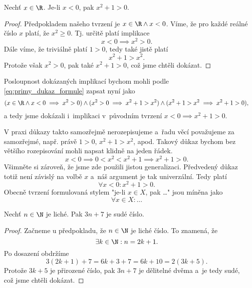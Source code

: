 \begin{proposition}
    Nechť $x\in\R$. Je-li $x<0$, pak $x^2+1>0$.
\end{proposition}
\begin{proof}
    Předpokladem našeho tvrzení je $x\in\R \land x<0$. Víme, že pro každé reálné číslo $x$ platí, že $x^2\geq 0$. Tj. určitě platí implikace
    \begin{equation*}
        x<0 \implies x^2>0.
    \end{equation*}
    Dále víme, že triviálně platí $1>0$, tedy také jistě platí
    \begin{equation*}
        x^2+1>x^2.
    \end{equation*}
    Protože však $x^2>0$, pak také
    $x^2+1>0$, což jsme chtěli dokázat.
\end{proof}
Posloupnost dokázaných implikací bychom mohli podle \eqref{eq:primy_dukaz_formule} zapsat nyní jako
\begin{equation*}
    (x\in\R \land x<0 \implies x^2>0) \land (x^2>0 \implies x^2+1>x^2) \land (x^2+1>x^2 \implies x^2+1>0),
\end{equation*}
a tedy jsme dokázali i~implikaci v~původním tvrzení $x<0 \implies x^2+1>0$.\par
V praxi důkazy takto samozřejmě nerozepisujeme a~řadu věcí považujeme za samozřejmé, např. právě $1>0$, $x^2+1>x^2$, apod. Takový důkaz bychom bez většího rozepisování mohli napsat klidně na jeden řádek.
\begin{equation*}
    x<0 \implies 0<x^2<x^2+1 \implies x^2+1>0.
\end{equation*}
Všimněte si zároveň, že jsme zde použili jistou generalizaci. Předvedený důkaz totiž není závislý na volbě $x$ a~náš argument je tak univerzální. Tedy platí
\begin{equation*}
    \forall x<0: x^2+1>0.
\end{equation*}
Obecně tvrzení formulovaná stylem "je-li $x\in X$, pak \dots" jsou míněna jako
\begin{equation*}
    \forall x\in X: \dots
\end{equation*}
\begin{proposition}
    Nechť $n\in\N$ je liché. Pak $3n+7$ je sudé číslo.
\end{proposition}
\begin{proof}
    Začneme u předpokladu, že $n\in\N$ je liché číslo. To znamená, že
    \begin{equation*}
        \exists k\in\N : n=2k+1.
    \end{equation*}
    Po dosazení obdržíme
    \begin{equation*}
        3(2k+1)+7=6k+3+7=6k+10=2(3k+5).
    \end{equation*}
    Protože $3k+5$ je přirozené číslo, pak $3n+7$ je dělitelné dvěma a~je tedy sudé, což jsme chtěli dokázat.
\end{proof}
